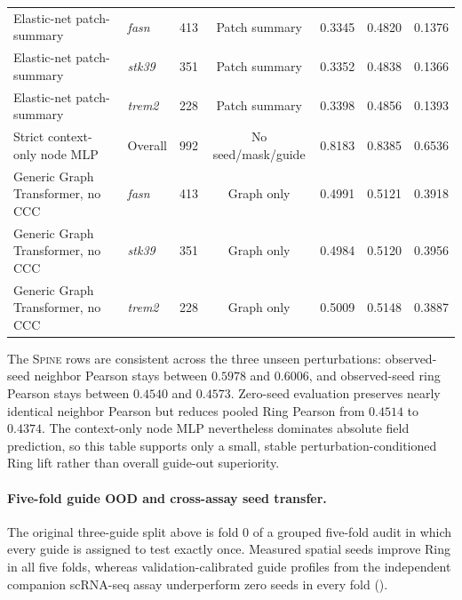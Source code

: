 \documentclass[sigconf,review,balance=false]{acmart}
\newcommand{\methodname}{\textsc{Spine}\xspace}
\begin{document}
\begin{table}[t]
{\begin{tabular}{llrcccc}
Elastic-net patch-summary &
\textit{fasn} &
413 &
Patch summary &
0.3345 &
0.4820 &
0.1376 \\

Elastic-net patch-summary &
\textit{stk39} &
351 &
Patch summary &
0.3352 &
0.4838 &
0.1366 \\

Elastic-net patch-summary &
\textit{trem2} &
228 &
Patch summary &
0.3398 &
0.4856 &
0.1393 \\

Strict context-only node MLP &
Overall &
992 &
No seed/mask/guide &
0.8183 &
0.8385 &
0.6536 \\

Generic Graph Transformer, no CCC &
\textit{fasn} &
413 &
Graph only &
0.4991 &
0.5121 &
0.3918 \\

Generic Graph Transformer, no CCC &
\textit{stk39} &
351 &
Graph only &
0.4984 &
0.5120 &
0.3956 \\

Generic Graph Transformer, no CCC &
\textit{trem2} &
228 &
Graph only &
0.5009 &
0.5148 &
0.3887 \\

\bottomrule
\end{tabular}
}
\end{table}

The \methodname{} rows are consistent across the three unseen perturbations:
observed-seed neighbor Pearson stays between $0.5978$ and $0.6006$, and
observed-seed ring Pearson stays between $0.4540$ and $0.4573$. Zero-seed
evaluation preserves nearly identical neighbor Pearson but reduces pooled Ring
Pearson from $0.4514$ to $0.4374$. The context-only node MLP nevertheless
dominates absolute field prediction, so this table supports only a small,
stable perturbation-conditioned Ring lift rather than overall guide-out
superiority.

\paragraph{Five-fold guide OOD and cross-assay seed transfer.}
The original three-guide split above is fold 0 of a grouped five-fold audit in
which every guide is assigned to test exactly once. Measured spatial seeds
improve Ring in all five folds, whereas validation-calibrated guide profiles
from the independent companion scRNA-seq assay underperform zero seeds in
every fold ().
\end{document}
